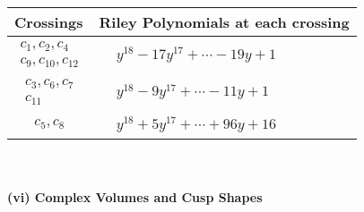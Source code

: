 \documentclass[1p]{elsarticle_modified}
\theoremstyle{definition}
\begin{document}
\begin{tabular}{m{50pt}|m{274pt}}
Crossings & \hspace{64pt}Riley Polynomials at each crossing \\
\hline $$\begin{aligned}c_{1},c_{2},c_{4}\\c_{9},c_{10},c_{12}\end{aligned}$$&$\begin{aligned}
&y^{18}-17 y^{17}+\cdots-19 y+1
\end{aligned}$\\
\hline $$\begin{aligned}c_{3},c_{6},c_{7}\\c_{11}\end{aligned}$$&$\begin{aligned}
&y^{18}-9 y^{17}+\cdots-11 y+1
\end{aligned}$\\
\hline $$\begin{aligned}c_{5},c_{8}\end{aligned}$$&$\begin{aligned}
&y^{18}+5 y^{17}+\cdots+96 y+16
\end{aligned}$\\
\hline
\end{tabular}\\~\\
\newpage\flushleft \textbf{(vi) Complex Volumes and Cusp Shapes}
\end{document}
